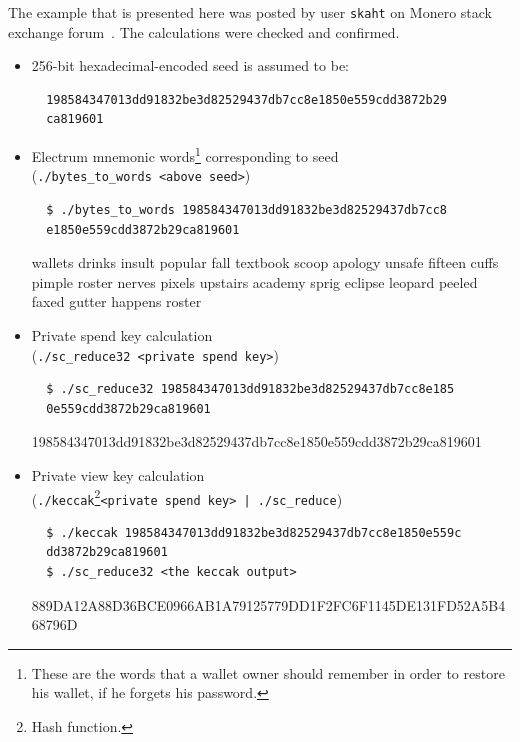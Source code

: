 The example that is presented here was posted by user \verb|skaht| on Monero stack exchange forum~\cite{stackexchange}. The calculations were checked and confirmed.
\begin{itemize}
  \item 256-bit hexadecimal-encoded seed is assumed to be:
  \begin{verbatim}
  198584347013dd91832be3d82529437db7cc8e1850e559cdd3872b29
  ca819601
  \end{verbatim}
  \item Electrum mnemonic words\footnote{These are the words that a wallet owner should remember in order to restore his wallet, if he forgets his password.} corresponding to seed\\
  (\verb|./bytes_to_words <above seed>|)
  \begin{verbatim}
  $ ./bytes_to_words 198584347013dd91832be3d82529437db7cc8
  e1850e559cdd3872b29ca819601
  \end{verbatim}
  \begin{tcolorbox}[colback=blue!5!white,colframe=blue!65!black,title=Output:]
    wallets drinks insult popular fall textbook scoop apology unsafe fifteen cuffs pimple roster nerves pixels upstairs academy sprig eclipse leopard peeled faxed gutter happens roster
  \end{tcolorbox}
  \item Private spend key calculation\\
  (\verb|./sc_reduce32 <private spend key>|)
  \begin{verbatim}
  $ ./sc_reduce32 198584347013dd91832be3d82529437db7cc8e185
  0e559cdd3872b29ca819601
  \end{verbatim}
  \begin{tcolorbox}[colback=blue!5!white,colframe=blue!65!black,title=Output:]
    \small{198584347013dd91832be3d82529437db7cc8e1850e559cdd3872b29ca819601}
  \end{tcolorbox}
  \item Private view key calculation\\
  (\verb|./keccak|\footnote{Hash function.}\verb=<private spend key> | ./sc_reduce=)
  \begin{verbatim}
  $ ./keccak 198584347013dd91832be3d82529437db7cc8e1850e559c
  dd3872b29ca819601
  $ ./sc_reduce32 <the keccak output>
  \end{verbatim}
  \begin{tcolorbox}[colback=blue!5!white,colframe=blue!65!black,title=Output:]
    \footnotesize{889DA12A88D36BCE0966AB1A79125779DD1F2FC6F1145DE131FD52A5B468796D}

\end{tcolorbox}
\end{itemize}
